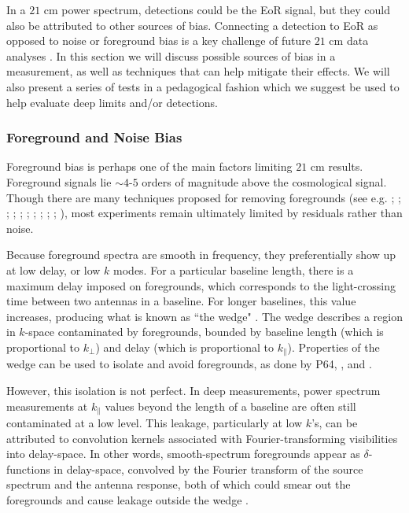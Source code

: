 \documentclass[preprint2,numberedappendix,tighten]{aastex6}  %
\begin{document}
In a $21$ cm power spectrum, detections could be the EoR signal, but they could also 
be attributed to other sources of bias. Connecting a detection to EoR as opposed to noise or foreground bias is a key challenge of 
future $21$ cm data analyses \citep[e.g.][]{petrovic_and_oh2011}. In this section we will discuss possible sources of bias in a measurement, as well as techniques 
that can help mitigate their effects. We will also present a series of tests in a pedagogical fashion which we suggest be used to 
help evaluate deep limits and/or detections.

\subsubsection{Foreground and Noise Bias}
\label{sec:BiasTypes}

Foreground bias is perhaps one of the main factors limiting $21$ cm results. Foreground signals lie $\sim4$-$5$ orders of 
magnitude above the cosmological signal. Though there are many techniques proposed for removing foregrounds (see e.g. \citealt{vedantham_et_al2012}; \citealt{parsons_et_al2012a}; \citealt{parsons_et_al2012b}; \citealt{dillon_et_al2013a}; \citealt{wang_et_al2013}; \citealt{parsons_et_al2014}; \citealt{liu_et_al2014a}; \citealt{liu_et_al2014b}; \citealt{dillon_et_al2015}; \citealt{pober_et_al2016a}; \citealt{trott_et_al2016}), most 
experiments remain ultimately limited by residuals rather than noise.

Because foreground spectra are smooth in frequency, they preferentially show up at low delay, or low $k$ modes. For a particular 
baseline length, there is a maximum delay imposed on foregrounds, which corresponds to the light-crossing time between two 
antennas in a baseline. For longer baselines, this value increases, producing what is known as ``the 
wedge"
\citep{datta_et_al2010, parsons_et_al2012b, vedantham_et_al2012, pober_et_al2013, thyagarajan_et_al2013, liu_et_al2014a, liu_et_al2014b, patil_et_al2017}. 
The wedge describes a region in $k$-space contaminated by foregrounds, bounded by baseline length (which is proportional to $k_{\perp}$) and delay (which is 
proportional to $k_{\parallel}$). Properties of the wedge can be used to isolate and 
avoid foregrounds, as done by P64, 
\citet{parsons_et_al2014}, and \citet{jacobs_et_al2015}.

However, this isolation is not perfect.  In deep measurements, power spectrum measurements at $k_{\parallel}$ values beyond 
the length of a baseline are often still contaminated at a low level. This leakage, particularly at low $k$'s, can be attributed to 
convolution kernels associated with Fourier-transforming visibilities into delay-space. In other words, smooth-spectrum 
foregrounds appear as $\delta$-functions in delay-space, convolved by the Fourier transform of the source spectrum and the 
antenna response, both of which could smear out the foregrounds and cause leakage outside the wedge \citep[e.g.][]{ewall-wice_et_al2017}.
\end{document}
